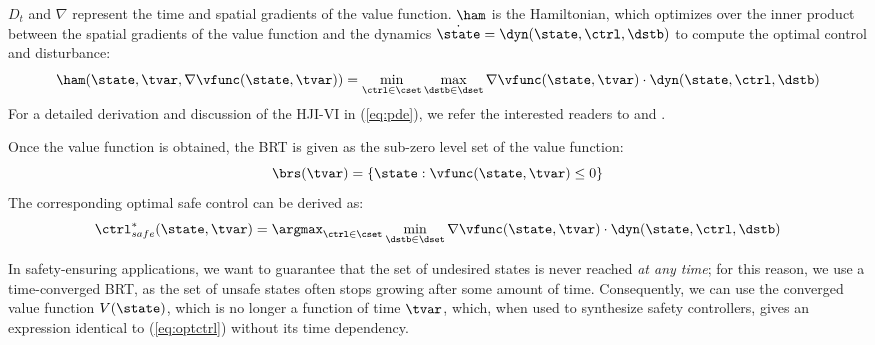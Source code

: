 % 
$D_t$ and $\nabla$ represent the time and spatial gradients of the value function. $\ham$ is the Hamiltonian, which optimizes over the inner product between the spatial gradients of the value function and the dynamics $\dot{\state} = \dyn(\state, \ctrl, \dstb)$ to compute the optimal control and disturbance:
% 
\begin{equation}\label{eq:HJIVI_ham_live}
    \ham(\state, \tvar, \nabla \vfunc(\state, \tvar)) = \min_{\ctrl \in \cset} \max_{\dstb \in \dset} \nabla \vfunc(\state, \tvar) \cdot \dyn(\state, \ctrl, \dstb)
\end{equation}
% 
For a detailed derivation and discussion of the HJI-VI in (\ref{eq:pde}), we refer the interested readers to \cite{mitchell2005time} and \cite{bansal2017hamilton}. 

Once the value function is obtained, the BRT is given as the sub-zero level set of the value function:
% 
\begin{equation}
\brs(\tvar)=\{\state: \vfunc(\state, \tvar) \leq 0\}
\end{equation}
% 
The corresponding optimal safe control can be derived as:
% 
\begin{equation}\label{eq:optctrl}
\ctrl^{*}_{safe}(\state, \tvar)=\argmax_{\ctrl \in \cset} \min_{\dstb \in \dset}\nabla \vfunc(\state, \tvar) \cdot \dyn(\state, \ctrl, \dstb)
\end{equation}
% 


In safety-ensuring applications, we want to guarantee that the set of undesired states is never reached \textit{at any time}; for this reason, we use a time-converged BRT, as the set of unsafe states often stops growing after some amount of time. Consequently, we can use the converged value function $V(\state)$, which is no longer a function of time $\tvar$, which, when used to synthesize safety controllers, gives an expression identical to (\ref{eq:optctrl}) without its time dependency.

